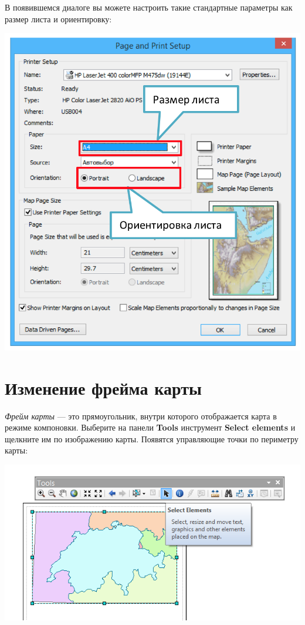 \documentclass[12pt,]{book}
\begin{document}
В появившемся диалоге вы можете настроить такие стандартные параметры как размер листа и ориентировку:

\includegraphics{images/Appendix/image52.png}

\hypertarget{section-49}{%
\section{Изменение фрейма карты}\label{section-49}}

\emph{Фрейм карты} --- это прямоугольник, внутри которого отображается карта в режиме компоновки. Выберите на панели \textbf{Tools} инструмент \textbf{Select elements} и щелкните им по изображению карты. Появятся управляющие точки по периметру карты:

\includegraphics{images/Appendix/image53.png}
\end{document}
